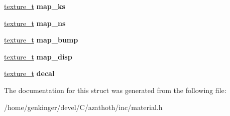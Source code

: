 \begin{DoxyCompactItemize}
\mbox{\label{structmaterial__t_ac7cf9f0c9df16be3976f687f6b623522}} 
\mbox{\hyperlink{structtexture__t}{texture\+\_\+t}} {\bfseries map\+\_\+ks}
\item 
\mbox{\label{structmaterial__t_a221281df36aae111e22cc221651fe7ac}} 
\mbox{\hyperlink{structtexture__t}{texture\+\_\+t}} {\bfseries map\+\_\+ns}
\item 
\mbox{\label{structmaterial__t_a08e50723c14c438f1e5d3ccd993520cc}} 
\mbox{\hyperlink{structtexture__t}{texture\+\_\+t}} {\bfseries map\+\_\+bump}
\item 
\mbox{\label{structmaterial__t_ab17d900fb4e993b71003475a524b2fc4}} 
\mbox{\hyperlink{structtexture__t}{texture\+\_\+t}} {\bfseries map\+\_\+disp}
\item 
\mbox{\label{structmaterial__t_ab512861659fe64db3e398c12c7d4409d}} 
\mbox{\hyperlink{structtexture__t}{texture\+\_\+t}} {\bfseries decal}
\end{DoxyCompactItemize}


The documentation for this struct was generated from the following file\+:\begin{DoxyCompactItemize}
\item 
/home/genkinger/devel/\+C/azathoth/inc/material.\+h\end{DoxyCompactItemize}
